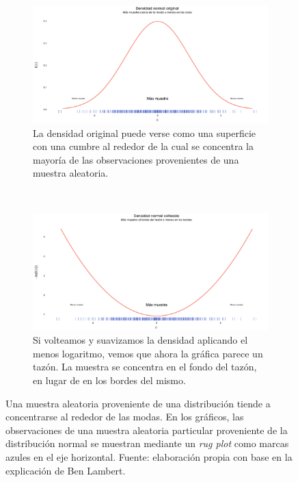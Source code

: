 \begin{figure}[h]
	\centering	
	\begin{subfigure}{0.45\textwidth}
        \includegraphics[width=\textwidth]{Figs/Bayes/Muestra_Normal_Original}
        \caption{La densidad original puede verse como una superficie con una cumbre al rededor de la cual se concentra la mayoría de las observaciones provenientes de una muestra aleatoria.}
        \label{fig:Muestra_Normal_Original}
    \end{subfigure}
    ~ 
    \begin{subfigure}{0.45\textwidth}
        \includegraphics[width=\textwidth]{Figs/Bayes/Muestra_Normal_Volteada}
        \caption{Si volteamos y suavizamos la densidad aplicando el menos logaritmo, vemos que ahora la gráfica parece un tazón. La muestra se concentra en el fondo del tazón, en lugar de en los bordes del mismo.}
        \label{fig:Muestra_Normal_Volteada}
    \end{subfigure}
	\caption{Una muestra aleatoria proveniente de una distribución tiende a concentrarse al rededor de las modas. En los gráficos, las observaciones de una muestra aleatoria particular proveniente de la distribución normal se muestran mediante un \textit{rug plot} como marcas azules en el eje horizontal. Fuente: elaboración propia con base en la explicación de {\color{Red} Ben Lambert}.}
	\label{fig:Muestra_Normal}	
\end{figure}


